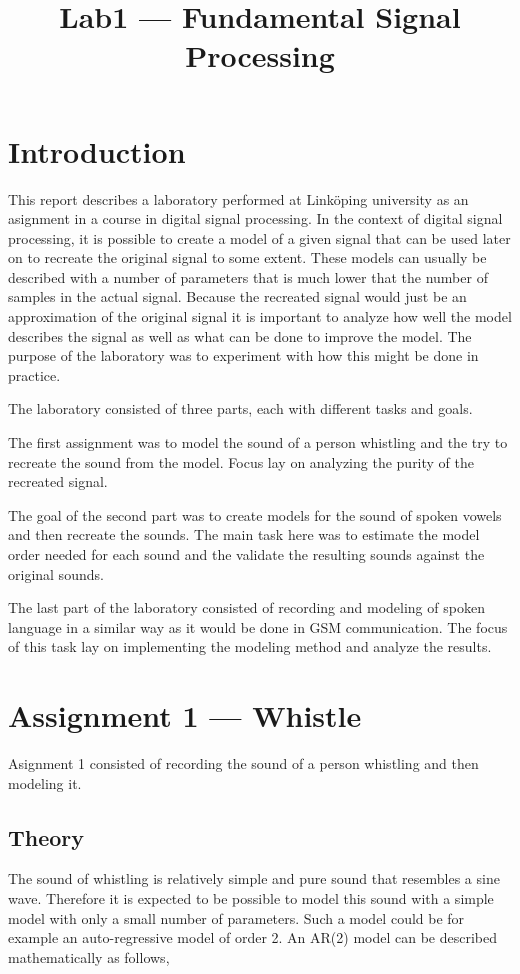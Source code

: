 \documentclass{IEEEtran}
\begin{document}
\title{Lab1 --- Fundamental Signal Processing}

\maketitle

\section{Introduction}
This report describes a laboratory performed at Linköping university as an
asignment in a course in digital signal processing. In the context of
digital signal processing, it is possible to create a model of a given
signal that can be used later on to recreate the original signal to some
extent. These models can usually be described with a number of parameters
that is much lower that the number of samples in the actual signal. Because
the recreated signal would just be an approximation of the original signal
it is important to analyze how well the model describes the signal as well
as what can be done to improve the model. The purpose of the laboratory was
to experiment with how this might be done in practice.

The laboratory consisted of three parts, each with different tasks and
goals.

The first assignment was to model the sound of a person whistling and the
try to recreate the sound from the model. Focus lay on analyzing the purity
of the recreated signal.

The goal of the second part was to create models for the sound of spoken
vowels and then recreate the sounds. The main task here was to estimate
the model order needed for each sound and the validate the resulting
sounds against the original sounds.

The last part of the laboratory consisted of recording and modeling of
spoken language in a similar way as it would be done in GSM communication.
The focus of this task lay on implementing the modeling method and analyze
the results.

\section{Assignment 1 --- Whistle}
Asignment 1 consisted of recording the sound of a person whistling and then
modeling it.

\subsection{Theory}
\label{sec:whistletheory}
The sound of whistling is relatively simple and pure sound that resembles
a sine wave. Therefore it is expected to be possible to model this sound
with a simple model with only a small number of parameters. Such a model
could be for example an auto-regressive model of order 2. An AR(2) model
can be described mathematically as follows,
\end{document}
